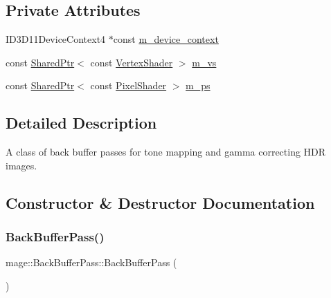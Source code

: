 \subsection*{Private Attributes}
\begin{DoxyCompactItemize}
\item 
I\+D3\+D11\+Device\+Context4 $\ast$const \hyperlink{classmage_1_1_back_buffer_pass_a08d816be20d35edae0b8fc7975bde76d}{m\+\_\+device\+\_\+context}
\item 
const \hyperlink{namespacemage_a1e01ae66713838a7a67d30e44c67703e}{Shared\+Ptr}$<$ const \hyperlink{classmage_1_1_vertex_shader}{Vertex\+Shader} $>$ \hyperlink{classmage_1_1_back_buffer_pass_ac2117930285072c5063881124ba38a5f}{m\+\_\+vs}
\item 
const \hyperlink{namespacemage_a1e01ae66713838a7a67d30e44c67703e}{Shared\+Ptr}$<$ const \hyperlink{namespacemage_a27ecaf266420ee7a494d64edc0757129}{Pixel\+Shader} $>$ \hyperlink{classmage_1_1_back_buffer_pass_a3890afe2710539dfe25ce95be802c2fc}{m\+\_\+ps}
\end{DoxyCompactItemize}


\subsection{Detailed Description}
A class of back buffer passes for tone mapping and gamma correcting H\+DR images. 

\subsection{Constructor \& Destructor Documentation}
\hypertarget{classmage_1_1_back_buffer_pass_a46ce63d05208fc3dea43244713a6a280}{}\label{classmage_1_1_back_buffer_pass_a46ce63d05208fc3dea43244713a6a280} 
\subsubsection{\texorpdfstring{Back\+Buffer\+Pass()}{BackBufferPass()}\hspace{0.1cm}{\footnotesize\ttfamily [1/3]}}
{\footnotesize\ttfamily mage\+::\+Back\+Buffer\+Pass\+::\+Back\+Buffer\+Pass (\begin{DoxyParamCaption}{ }\end{DoxyParamCaption})}

